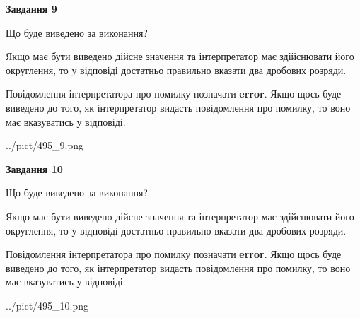 \documentclass[12pt, ukrainian]{article}
\begin{document}
{\begin {Large}
{\begin {center}\textbf{Завдання 9}\end {center}}\par
Що буде виведено за виконання? \par

Якщо має бути виведено дійсне значення та інтерпретатор має здійснювати його округлення, 
то у відповіді достатньо правильно вказати два дробових розряди.

Повідомлення інтерпретатора про помилку позначати \textbf{error}.
Якщо щось буде виведено до того, як інтерпретатор видасть повідомлення про помилку, 
то воно має вказуватись у відповіді. \par

\begin{center}
	{../pict/495_9.png}
\end{center}
\newpage

{\begin {center}\textbf{Завдання 10}\end {center}}\par
Що буде виведено за виконання? \par

Якщо має бути виведено дійсне значення та інтерпретатор має здійснювати його округлення, 
то у відповіді достатньо правильно вказати два дробових розряди.

Повідомлення інтерпретатора про помилку позначати \textbf{error}.
Якщо щось буде виведено до того, як інтерпретатор видасть повідомлення про помилку, 
то воно має вказуватись у відповіді. \par

\begin{center}
	{../pict/495_10.png}
\end{center}
\newpage

\end {Large}}
\end{document}
